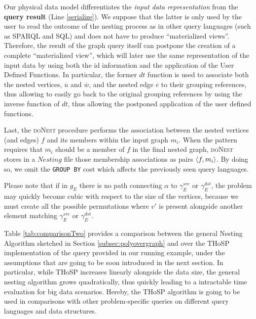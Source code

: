 Our physical data model differentiates the \textit{input data  representation} from the \textbf{query result} (Line \ref{serialize}). 
We suppose that the latter is only used by the user to read the outcome of the nesting process as in other  query languages (such as SPARQL and SQL) and does not have to
produce ``materialized views''. Therefore, the result of the graph query itself can postpone the creation of a complete ``materialized view'', which will later use the same representation of the input data by using both the id information and the application of the User Defined Functions. In particular, the former $dt$ function is used to associate both the nested vertices, $\overline{u}$ and $\overline{w}$, and the nested edge $\overline{e}$ to their grouping references, thus allowing to easily go back to the original grouping references by using the inverse function of $dt$, thus allowing the postponed application of the user defined functions.


Last, the \textsc{doNest} procedure performs the association between the nested vertices (and edges) $f$ and its members within the input graph $m_i$. When the pattern requires that $m_i$ should be a member of $f$ in the final nested graph,  \textsc{doNest} stores in a $Nesting$ file those membership associations as pairs $\Braket{f,m_i}$. By doing so, we omit the \texttt{GROUP BY} cost which affects the previously seen query languages. 
 
Please note that if in $g_E$ there is no path connecting $\alpha$ to $\gamma_E^{src}$ or $\gamma_E^{dst}$, the problem may quickly become cubic with respect to the size of the vertices, because we must create all the possible permutations where $v'$ is present alongside another element matching $\gamma_E^{src}$ or $\gamma_E^{dst}$.


Table \ref{tab:comparisonTwo} provides a comparison between the general Nesting Algorithm sketched in Section \vref{subsec:polyovergraph} and over the THoSP implementation of the query provided in our running example, under the assumptions that are going to be soon introduced in the next section. In particular, while THoSP increases linearly alongside the data size, the general nesting algorithm grows quadratically, thus quickly leading to a intractable time evaluation for big data scenarios. Hereby, the THoSP algorithm is going to be used in comparisons with other problem-specific queries on different query languages and data structures.